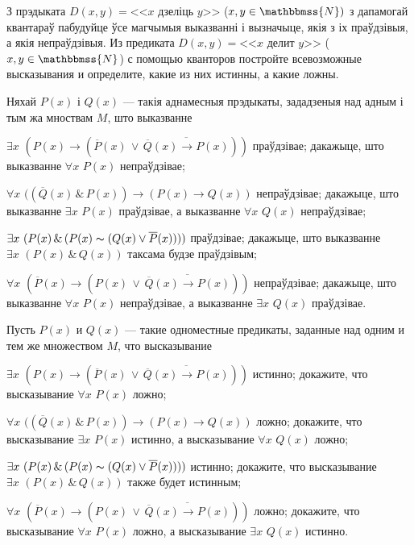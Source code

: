 \begin{problemList}
{\begin{belarusianEnumerate}
\end{belarusianEnumerate}
}

\bigskip

\problemItemSimple
{З прэдыката $D(x, y) = \text{<<} x \,\,\text{дзеліць}\,\, y\text{>>}$ ($x, y \in \mathbbmss{N})$ з дапамогай квантараў пабудуйце ўсе магчымыя выказванні і вызначыце, якія з іх праўдзівыя, а якія непраўдзівыя.}
{Из предиката $D(x, y) = \text{<<} x \,\,\text{делит}\,\,
y\text{>>}$ ($x, y \in \mathbbmss{N}$) с помощью
кванторов постройте всевозможные высказывания и определите, какие из
них истинны, а какие ложны.}

\bigskip

\problemItemSimple
{%
Няхай $P(x)$ і $Q(x)$ --- такія аднамесныя прэдыкаты, зададзеныя над адным і тым жа мноствам $M$, што выказванне
\begin{belarusianEnumerate}
	\item $\exists x \,\, (P(x) \to (\overline{P}(x) \,\vee\, \overline{\overline{Q}(x) \to P(x)}))$ праўдзівае; дакажыце, што выказванне $\forall x \,\, P(x)$ непраўдзівае;
	\item $\forall x \,\, ((\overline{Q}(x) \,\&\, P(x)) \to (P(x) \to Q(x))$ непраўдзівае; дакажыце, што выказванне $\exists x \,\, P(x)$ праўдзівае, а выказванне $\forall x \,\, Q(x)$ непраўдзівае;
	\item $\exists x \,\, (P(x) \,\&\, (P(x) \thicksim (Q(x) \vee \overline{P}(x))))$ праўдзівае; дакажыце, што выказванне \\ $\exists x \,\, (P(x) \,\&\, Q(x))$ таксама будзе праўдзівым;
	\item $\forall x \,\, (\overline{P}(x) \to (P(x) \,\vee\, \overline{\overline{Q}(x) \to P(x)}))$ непраўдзівае; дакажыце, што выказванне $\forall x \,\, P(x)$ непраўдзівае, а выказванне $\exists x \,\, Q(x)$ праўдзівае.
\end{belarusianEnumerate}
\textbf{}
\vspace{-1.5em}
}
{%
Пусть $P(x)$ и $Q(x)$ --- такие одноместные предикаты, заданные над
одним и тем же множеством $M$, что высказывание
\begin{russianEnumerate}
	\item $\exists x \,\, (P(x) \to (\overline{P}(x) \,\vee\, \overline{\overline{Q}(x) \to P(x)}))$ истинно; докажите, что высказывание $\forall x \,\, P(x)$ ложно;
	\item $\forall x \,\, ((\overline{Q}(x) \,\&\, P(x)) \to (P(x) \to Q(x))$ ложно; докажите, что высказывание $\exists x \,\, P(x)$ истинно, а высказывание $\forall x \,\, Q(x)$ ложно;
	\item $\exists x \,\, (P(x) \,\&\, (P(x) \thicksim (Q(x) \vee \overline{P}(x))))$ истинно; докажите, что высказывание \\ $\exists x \,\, (P(x) \,\&\, Q(x))$ также будет истинным;
	\item $\forall x \,\, (\overline{P}(x) \to (P(x) \,\vee\, \overline{\overline{Q}(x) \to P(x)}))$ ложно; докажите, что высказывание $\forall x \,\, P(x)$ ложно, а высказывание $\exists x \,\, Q(x)$ истинно.
\end{russianEnumerate}
}


\end{problemList}

